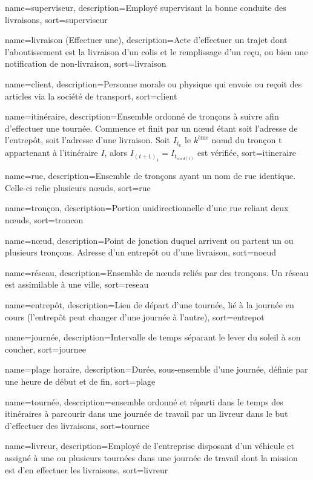 {
	name={superviseur},
	description={Employé supervisant la bonne conduite des livraisons},
	sort={superviseur}
}

{
	name={livraison (Effectuer une)},
	description={Acte d'effectuer un trajet dont l'aboutissement est la livraison d'un colis et le remplissage d'un reçu, ou bien une notification de non-livraison},
	sort={livraison}
}

{
	name={client},
	description={Personne morale ou physique qui envoie ou reçoit des articles via la société de transport},
	sort={client}
}

{
	name={itinéraire},
	description={Ensemble ordonné de tronçons à suivre afin d'effectuer une tournée. Commence et finit par un nœud étant soit l'adresse de l'entrepôt, soit l'adresse d'une livraison. Soit $I_{t_k}$ le $k^\text{ème}$ nœud du tronçon t appartenant à l'itinéraire $I$, alors $I_{{(t+1)}_{1}} = I_{{t}_{card(t)}}$ est vérifiée},
	sort={itineraire}
}

{
	name={rue},
	description={Ensemble de tronçons ayant un nom de rue identique. Celle-ci relie plusieurs nœuds},
	sort={rue}
}

{
	name={tronçon},
	description={Portion unidirectionnelle d'une rue reliant deux nœuds},
	sort={troncon}
}

{
	name={nœud},
	description={Point de jonction duquel arrivent ou partent un ou plusieurs tronçons. Adresse d'un entrepôt ou d'une livraison},
	sort={noeud}
}

{
	name={réseau},
	description={Ensemble de nœuds reliés par des tronçons. Un réseau est assimilable à une ville},
	sort={reseau}
}

{
	name={entrepôt},
	description={Lieu de départ d'une tournée, lié à la journée en cours (l'entrepôt peut changer d'une journée à l'autre)},
	sort={entrepot}
}

{
	name={journée},
	description={Intervalle de temps séparant le lever du soleil à son coucher},
	sort={journee}
}

{
	name={plage horaire},
	description={Durée, sous-ensemble d'une journée, définie par une heure de début et de fin},
	sort={plage}
}

{
	name={tournée},
	description={ensemble ordonné et réparti dans le temps des itinéraires à parcourir dans une journée de travail par un livreur dans le but d'effectuer des livraisons},
	sort={tournee}
}

{
	name={livreur},
	description={Employé de l'entreprise disposant d'un véhicule et assigné à une ou plusieurs tournées dans une journée de travail dont la mission est d'en effectuer les livraisons},
	sort={livreur}
}
